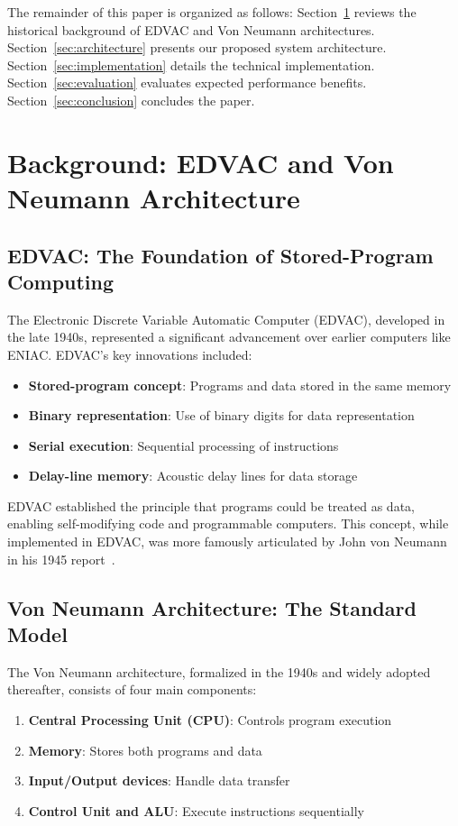 \documentclass[11pt,a4paper]{article}
\begin{document}
The remainder of this paper is organized as follows: Section~\ref{sec:background} reviews the historical background of EDVAC and Von Neumann architectures. Section~\ref{sec:architecture} presents our proposed system architecture. Section~\ref{sec:implementation} details the technical implementation. Section~\ref{sec:evaluation} evaluates expected performance benefits. Section~\ref{sec:conclusion} concludes the paper.

\section{Background: EDVAC and Von Neumann Architecture}
\label{sec:background}

\subsection{EDVAC: The Foundation of Stored-Program Computing}

The Electronic Discrete Variable Automatic Computer (EDVAC), developed in the late 1940s, represented a significant advancement over earlier computers like ENIAC. EDVAC's key innovations included:

\begin{itemize}
\item \textbf{Stored-program concept}: Programs and data stored in the same memory
\item \textbf{Binary representation}: Use of binary digits for data representation
\item \textbf{Serial execution}: Sequential processing of instructions
\item \textbf{Delay-line memory}: Acoustic delay lines for data storage
\end{itemize}

EDVAC established the principle that programs could be treated as data, enabling self-modifying code and programmable computers. This concept, while implemented in EDVAC, was more famously articulated by John von Neumann in his 1945 report~\citep{vonneumann1945report}.

\subsection{Von Neumann Architecture: The Standard Model}

The Von Neumann architecture, formalized in the 1940s and widely adopted thereafter, consists of four main components:

\begin{enumerate}
\item \textbf{Central Processing Unit (CPU)}: Controls program execution
\item \textbf{Memory}: Stores both programs and data
\item \textbf{Input/Output devices}: Handle data transfer
\item \textbf{Control Unit and ALU}: Execute instructions sequentially
\end{enumerate}
\end{document}
